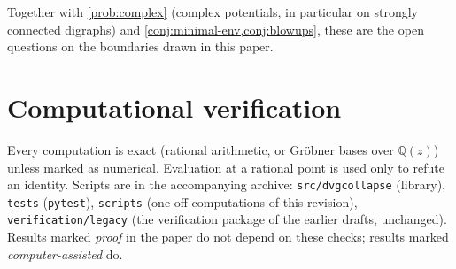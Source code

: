 \documentclass[11pt]{amsart}
\theoremstyle{plain}
\theoremstyle{definition}
\theoremstyle{remark}
\numberwithin{equation}{section}
\newcommand{\code}[1]{{\ttfamily\nolinkurl{#1}}}
\newcommand{\QQ}{\mathbb{Q}}
\newcommand{\Qz}{\QQ(z)}
\begin{document}
Together with \cref{prob:complex} (complex potentials, in particular on strongly connected digraphs) and \cref{conj:minimal-env,conj:blowups}, these are the open questions on the boundaries drawn in this paper.

\appendix

\section{Computational verification}\label{app:verification}

Every computation is exact (rational arithmetic, or Gr\"obner bases over $\Qz$) unless marked as numerical. Evaluation at a rational point is used only to refute an identity. Scripts are in the accompanying archive: \code{src/dvgcollapse} (library), \code{tests} (\code{pytest}), \code{scripts} (one-off computations of this revision), \code{verification/legacy} (the verification package of the earlier drafts, unchanged). Results marked \emph{proof} in the paper do not depend on these checks; results marked \emph{computer-assisted} do.
\end{document}
